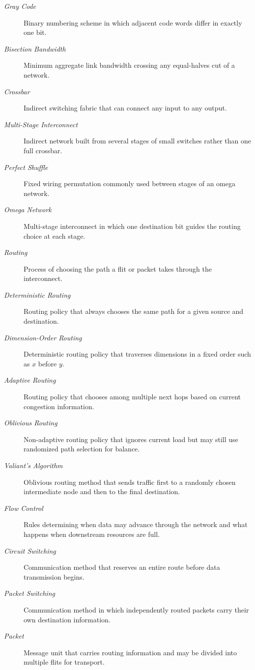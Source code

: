 \begin{description}
    \item[\textit{Gray Code}] Binary numbering scheme in which adjacent code words differ in exactly one bit.
    \item[\textit{Bisection Bandwidth}] Minimum aggregate link bandwidth crossing any equal-halves cut of a network.
    \item[\textit{Crossbar}] Indirect switching fabric that can connect any input to any output.
    \item[\textit{Multi-Stage Interconnect}] Indirect network built from several stages of small switches rather than one full crossbar.
    \item[\textit{Perfect Shuffle}] Fixed wiring permutation commonly used between stages of an omega network.
    \item[\textit{Omega Network}] Multi-stage interconnect in which one destination bit guides the routing choice at each stage.
    \item[\textit{Routing}] Process of choosing the path a flit or packet takes through the interconnect.
    \item[\textit{Deterministic Routing}] Routing policy that always chooses the same path for a given source and destination.
    \item[\textit{Dimension-Order Routing}] Deterministic routing policy that traverses dimensions in a fixed order such as $x$ before $y$.
    \item[\textit{Adaptive Routing}] Routing policy that chooses among multiple next hops based on current congestion information.
    \item[\textit{Oblivious Routing}] Non-adaptive routing policy that ignores current load but may still use randomized path selection for balance.
    \item[\textit{Valiant's Algorithm}] Oblivious routing method that sends traffic first to a randomly chosen intermediate node and then to the final destination.
    \item[\textit{Flow Control}] Rules determining when data may advance through the network and what happens when downstream resources are full.
    \item[\textit{Circuit Switching}] Communication method that reserves an entire route before data transmission begins.
    \item[\textit{Packet Switching}] Communication method in which independently routed packets carry their own destination information.
    \item[\textit{Packet}] Message unit that carries routing information and may be divided into multiple flits for transport.

\end{description}

